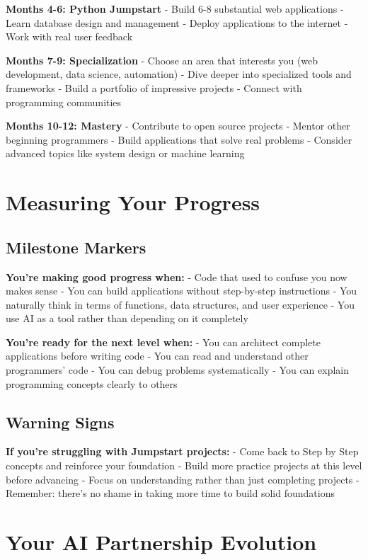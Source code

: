 \documentclass[
  letterpaper,
  DIV=11,
  numbers=noendperiod,
  oneside]{scrreprt}
\begin{document}
\textbf{Months 4-6: Python Jumpstart} - Build 6-8 substantial web
applications - Learn database design and management - Deploy
applications to the internet - Work with real user feedback

\textbf{Months 7-9: Specialization} - Choose an area that interests you
(web development, data science, automation) - Dive deeper into
specialized tools and frameworks - Build a portfolio of impressive
projects - Connect with programming communities

\textbf{Months 10-12: Mastery} - Contribute to open source projects -
Mentor other beginning programmers - Build applications that solve real
problems - Consider advanced topics like system design or machine
learning

\section{Measuring Your Progress}\label{measuring-your-progress}

\subsection{Milestone Markers}\label{milestone-markers}

\textbf{You're making good progress when:} - Code that used to confuse
you now makes sense - You can build applications without step-by-step
instructions - You naturally think in terms of functions, data
structures, and user experience - You use AI as a tool rather than
depending on it completely

\textbf{You're ready for the next level when:} - You can architect
complete applications before writing code - You can read and understand
other programmers' code - You can debug problems systematically - You
can explain programming concepts clearly to others

\subsection{Warning Signs}\label{warning-signs}

\textbf{If you're struggling with Jumpstart projects:} - Come back to
Step by Step concepts and reinforce your foundation - Build more
practice projects at this level before advancing - Focus on
understanding rather than just completing projects - Remember: there's
no shame in taking more time to build solid foundations

\section{Your AI Partnership
Evolution}\label{your-ai-partnership-evolution}
\end{document}
